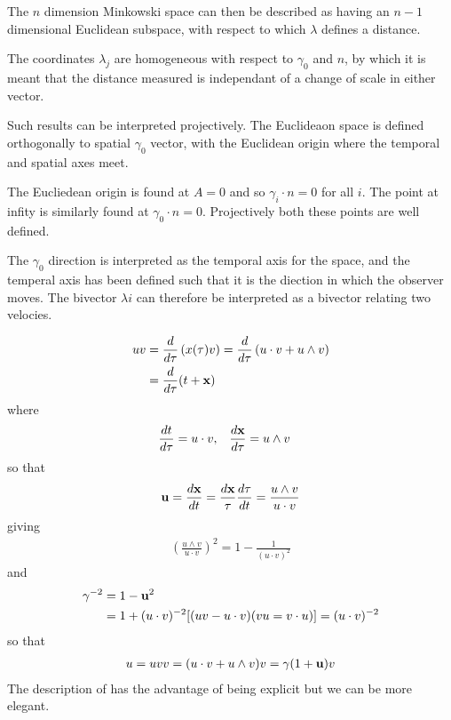 The  $n$ dimension Minkowski space can then be described as having an $n-1$ dimensional
Euclidean subspace,
with respect to which $\lambda$ defines a distance.


The coordinates $\lambda_j$ are homogeneous with respect to $\gamma_0$
and $n$, by which it is meant that the distance measured is independant
of a change of scale in either vector.


Such results can be interpreted projectively.
The Euclideaon space is defined orthogonally to spatial $\gamma_0$  vector,
with the Euclidean origin where the temporal and spatial axes meet.


The Eucliedean origin is found at $A = 0$
and so $\gamma_i\cdot n = 0$ for all $i$.
The point at infity is similarly found at
$\gamma_0\cdot n  = 0$.
Projectively both these points are well defined.


The $\gamma_0$ direction is interpreted as the temporal axis for the
space,
and the temperal axis has been defined such that it is the diection in
which the observer moves.
The bivector $\lambda i$ can therefore be interpreted as a bivector
relating two velocies.

\begin{align}
uv &= \frac{d}{d\tau}\left(x(\tau)v\right) 
= \frac{d}{d\tau} \left(u\cdot v + u\wedge v \right)\\
&= \frac{d}{d\tau}(t + {\bf x})
\end{align}
where
\begin{align}
 \frac{dt}{d\tau} &= u\cdot v, &  \frac{d{\bf x}}{d\tau} &= u\wedge v
\end{align}
so that
\begin{align}
{\bf u} = \frac{d{\bf x}}{dt} = \frac{d{\bf x}}{\tau}\frac{d\tau}{dt} 
= \frac{u\wedge v}{u\cdot v}
\end{align}
giving
\begin{align}
\left( \frac{u\wedge v}{u\cdot v} \right)^2 = 1 - \frac{1}{\left(u\cdot v\right)^2}
\end{align}
and
\begin{align}
\gamma^{-2} &= 1 - {\bf u}^2 \\
&= 1 +(u\cdot v)^{-2}[(uv - u\cdot v)(vu = v\cdot u)] = (u\cdot v)^{-2}
\end{align}
so that 
\begin{align}
u = uvv = (u\cdot v + u\wedge v)v = \gamma(1+{\bf u})v
\end{align}
The description of  has the advantage of being explicit
but we can be more elegant.


